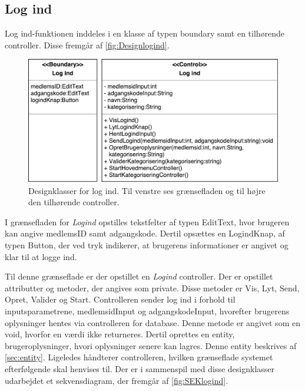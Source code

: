 \subsection*{Log ind}
Log ind-funktionen inddeles i en klasse af typen boundary samt en tilhørende controller. Disse fremgår af \autoref{fig:Designlogind}. 

\begin{figure} [H]
\centering
\includegraphics[width=1\textwidth]{figures/MVC/MVCLogInd}
\caption{Designklasser for log ind. Til venstre ses grænsefladen og til højre den tilhørende controller.}
\label{fig:Designlogind}
\end{figure}

\noindent
I grænsefladen for \textit{Logind} opstilles tekstfelter af typen EditText, hvor brugeren kan angive medlemsID samt adgangskode. Dertil opsættes en LogindKnap, af typen Button, der ved tryk indikerer, at brugerens informationer er angivet og klar til at logge ind. 

Til denne grænseflade er der opstillet en \textit{Logind} controller. Der er opstillet attributter og metoder, der angives som private. Disse metoder er Vis, Lyt, Send, Opret, Valider og Start. Controlleren sender log ind i forhold til inputsparametrene, medlemsidInput og adgangskodeInput, hvorefter brugerens oplysninger hentes via controlleren for database. Denne metode er angivet som en void, hvorfor en værdi ikke returneres. Dertil oprettes en entity, brugeroplysninger, hvori oplysninger senere kan lagres. Denne entity beskrives af \autoref{sec:entity}. Ligeledes håndterer controlleren, hvilken grænseflade systemet efterfølgende skal henvises til. Der er i sammenspil med disse designklasser udarbejdet et sekvensdiagram, der fremgår af \autoref{fig:SEKlogind}.


